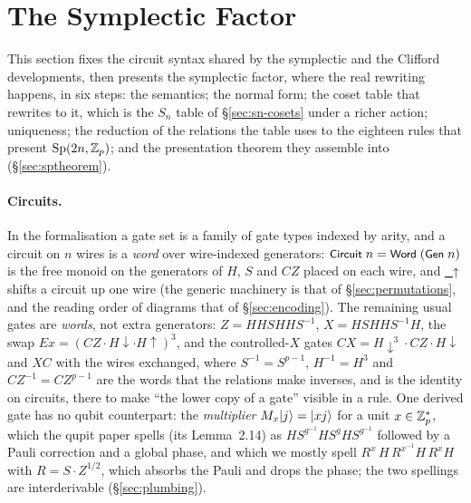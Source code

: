 \section{The Symplectic Factor}\label{sec:symplectic}

This section fixes the circuit syntax shared by the symplectic and the
Clifford developments, then presents the symplectic factor, where the
real rewriting happens, in six steps: the semantics; the normal form;
the coset table that rewrites to it, which is the $S_n$ table of
\S\ref{sec:sn-cosets} under a richer action; uniqueness; the reduction
of the relations the table uses to the eighteen rules that present
$\mathrm{Sp}(2n,\mathbb{Z}_p)$; and the presentation theorem they assemble into
(\S\ref{sec:sptheorem}).

\paragraph{Circuits.}  In the formalisation a gate set is a family of gate types indexed by
arity, and a circuit on $n$ wires is a \emph{word} over wire-indexed
generators: $\mbox{\textsf{\small Circuit}}\;n = \mbox{\textsf{\small Word}}\;(\mbox{\textsf{\small Gen}}\;n)$ is the free
monoid on the generators of $H$, $S$ and $CZ$ placed on each wire, and
$\mbox{\textsf{\small {\_}↑}}$ shifts a circuit up one wire (the generic machinery is
that of \S\ref{sec:permutations}, and the reading order of diagrams
that of \S\ref{sec:encoding}).  The remaining usual gates are \emph{words}, not extra
generators: $Z = H H S H H S^{-1}$, $X = H S H H S^{-1} H$, the swap
$\mathit{Ex} = (CZ \cdot H{\downarrow} \cdot H{\uparrow})^{3}$, and the
controlled-$X$ gates $CX = H{\downarrow}^{3} \cdot CZ \cdot
H{\downarrow}$ and $XC$ with the wires exchanged, where $S^{-1} =
S^{p-1}$, $H^{-1} = H^{3}$ and $CZ^{-1} = CZ^{p-1}$ are the words that
the relations make inverses, and  is the identity on
circuits, there to make ``the lower copy of a gate'' visible in a rule.
One derived gate has no qubit counterpart: the \emph{multiplier}
$M_x|j\rangle = |xj\rangle$ for a unit $x \in \mathbb{Z}_p^{*}$, which the qupit
paper spells (its Lemma~2.14) as $H S^{g^{-1}} H S^{g} H S^{g^{-1}}$
followed by a Pauli correction and a global phase, and which we mostly
spell $R^{x}\,H\,R^{x^{-1}}H\,R^{x}H$ with $R = S\cdot Z^{1/2}$, which
absorbs the Pauli and drops the phase; the two spellings are
interderivable (\S\ref{sec:plumbing}).

